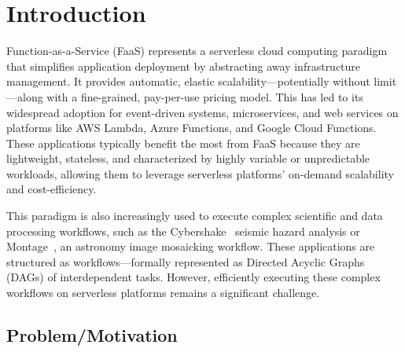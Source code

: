 \chapter{Introduction}
\chaptoc
\label{chap:intro}
\bigskip

Function-as-a-Service (FaaS) represents a serverless cloud computing paradigm that simplifies application deployment by abstracting away infrastructure management. It provides automatic, elastic scalability—potentially without limit—along with a fine-grained, pay-per-use pricing model. This has led to its widespread adoption for event-driven systems, microservices, and web services on platforms like AWS Lambda\cite{aws_lambda}, Azure Functions\cite{azure_functions}, and Google Cloud Functions\cite{google_cloud_run_functions}. These applications typically benefit the most from FaaS because they are lightweight, stateless, and characterized by highly variable or unpredictable workloads, allowing them to leverage serverless platforms' on-demand scalability and cost-efficiency.

This paradigm is also increasingly used to execute complex scientific and data processing workflows, such as the Cybershake~\cite{cybershake_workflow} seismic hazard analysis or Montage~\cite{montage_astronomy}, an astronomy image mosaicking workflow. These applications are structured as workflows—formally represented as Directed Acyclic Graphs (DAGs) of interdependent tasks. However, efficiently executing these complex workflows on serverless platforms remains a significant challenge. 

\section{Problem/Motivation}

